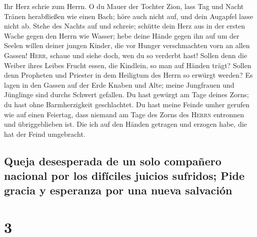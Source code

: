  Ihr Herz schrie zum Herrn. O du Mauer der Tochter Zion,
lass Tag und Nacht Tränen herabfließen wie einen Bach; höre auch nicht
auf, und dein Augapfel lasse nicht ab.  Stehe des Nachts
auf und schreie; schütte dein Herz aus in der ersten Wache gegen den
Herrn wie Wasser; hebe deine Hände gegen ihn auf um der Seelen willen
deiner jungen Kinder, die vor Hunger verschmachten vorn an allen Gassen!
 \textsc{Herr}, schaue und siehe doch, wen du so verderbt
hast! Sollen denn die Weiber ihres Leibes Frucht essen, die Kindlein, so
man auf Händen trägt? Sollen denn Propheten und Priester in dem
Heiligtum des Herrn so erwürgt werden?  Es lagen in den
Gassen auf der Erde Knaben und Alte; meine Jungfrauen und Jünglinge sind
durchs Schwert gefallen. Du hast gewürgt am Tage deines Zorns; du hast
ohne Barmherzigkeit geschlachtet.  Du hast meine Feinde
umher gerufen wie auf einen Feiertag, dass niemand am Tage des Zorns des
\textsc{Herrn} entronnen und übriggeblieben ist. Die ich auf den Händen
getragen und erzogen habe, die hat der Feind umgebracht.

\hypertarget{queja-desesperada-de-un-solo-compauxf1ero-nacional-por-los-difuxedciles-juicios-sufridos-pide-gracia-y-esperanza-por-una-nueva-salvaciuxf3n}{%
\subsection{Queja desesperada de un solo compañero nacional por los
difíciles juicios sufridos; Pide gracia y esperanza por una nueva
salvación}\label{queja-desesperada-de-un-solo-compauxf1ero-nacional-por-los-difuxedciles-juicios-sufridos-pide-gracia-y-esperanza-por-una-nueva-salvaciuxf3n}}

\hypertarget{section-2}{%
\section{3}\label{section-2}}

